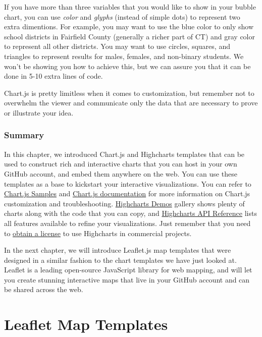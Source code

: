 \documentclass[
  english,
]{book}
\begin{document}
If you have more than three variables that you would like to show in your bubble chart, you can use \emph{color} and \emph{glyphs} (instead of simple dots) to represent two extra dimentions. For example, you may want to use the blue color to only show school districts in Fairfield County (generally a richer part of CT) and gray color to represent all other districts. You may want to use circles, squares, and triangles to represent results for males, females, and non-binary students. We won't be showing you how to achieve this, but we can assure you that it can be done in 5-10 extra lines of code.

Chart.js is pretty limitless when it comes to customization, but remember not to overwhelm the viewer and communicate only the data that are necessary to prove or illustrate your idea.

\hypertarget{summary11}{%
\subsection*{Summary}\label{summary11}}

In this chapter, we introduced Chart.js and Highcharts templates that can be used to construct rich and interactive charts that you can host in your own GitHub account, and embed them anywhere on the web. You can use these templates as a base to kickstart your interactive visualizations. You can refer to \href{https://www.chartjs.org/samples/latest/}{Chart.js Samples} and \href{https://www.chartjs.org/docs/latest/}{Chart.js documentation} for more information on Chart.js customization and troubleshooting. \href{https://www.highcharts.com/demo}{Highcharts Demos} gallery shows plenty of charts along with the code that you can copy, and \href{https://api.highcharts.com/highcharts/}{Highcharts API Reference} lists all features available to refine your visualizations. Just remember that you need to \href{https://shop.highsoft.com/}{obtain a license} to use Highcharts in commercial projects.

In the next chapter, we will introduce Leaflet.js map templates that were designed in a similar fashion to the chart templates we have just looked at. Leaflet is a leading open-source JavaScript library for web mapping, and will let you create stunning interactive maps that live in your GitHub account and can be shared across the web.

\hypertarget{leaflet}{%
\chapter{Leaflet Map Templates}\label{leaflet}}
\end{document}
